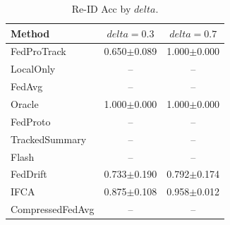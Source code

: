 \begin{table}[t]
\centering
\caption{Re-ID Acc by $delta$.}
\label{tab:delta_concept_re_id_accuracy}
\begin{tabular}{lcc}
\toprule
Method & $delta=0.3$ & $delta=0.7$ \\
\midrule
FedProTrack & 0.650$\pm$0.089 & 1.000$\pm$0.000 \\
LocalOnly & -- & -- \\
FedAvg & -- & -- \\
Oracle & 1.000$\pm$0.000 & 1.000$\pm$0.000 \\
FedProto & -- & -- \\
TrackedSummary & -- & -- \\
Flash & -- & -- \\
FedDrift & 0.733$\pm$0.190 & 0.792$\pm$0.174 \\
IFCA & 0.875$\pm$0.108 & 0.958$\pm$0.012 \\
CompressedFedAvg & -- & -- \\
\bottomrule
\end{tabular}
\end{table}
